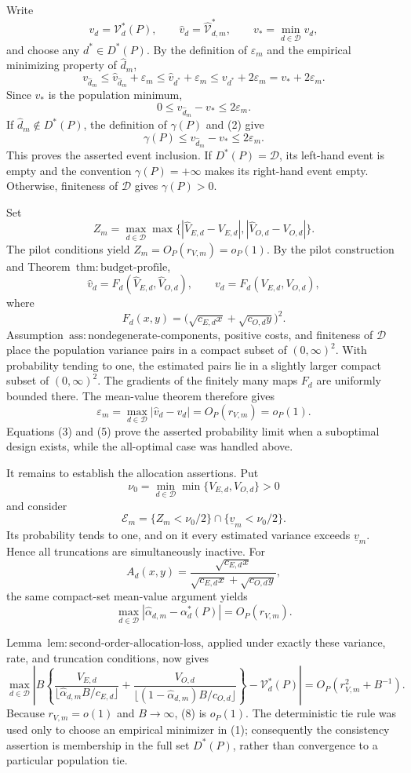 Write
\[
 v_d=\mathcal V_d^*(P),\qquad
 \widehat v_d=\widehat{\mathcal V}_{d,m}^*,\qquad
 v_* =\min_{d\in\mathcal D}v_d,
\]
and choose any \(d^*\in D^*(P)\).  By the definition of \(\varepsilon_m\) and the empirical minimizing property of \(\widehat d_m\),
\[
 v_{\widehat d_m}
 \le \widehat v_{\widehat d_m}+\varepsilon_m
 \le \widehat v_{d^*}+\varepsilon_m
 \le v_{d^*}+2\varepsilon_m
 =v_*+2\varepsilon_m. \tag{1}
\]
Since \(v_*\) is the population minimum,
\[
 0\le v_{\widehat d_m}-v_*\le2\varepsilon_m. \tag{2}
\]
If \(\widehat d_m\notin D^*(P)\), the definition of \(\gamma(P)\) and (2) give
\[
 \gamma(P)\le v_{\widehat d_m}-v_*\le2\varepsilon_m. \tag{3}
\]
This proves the asserted event inclusion.  If \(D^*(P)=\mathcal D\), its left-hand event is empty and the convention \(\gamma(P)=+\infty\) makes its right-hand event empty.  Otherwise, finiteness of \(\mathcal D\) gives \(\gamma(P)>0\).

Set
\[
 Z_m=\max_{d\in\mathcal D}\max\bigl\{
 |\widehat V_{E,d}-V_{E,d}|,
 |\widehat V_{O,d}-V_{O,d}|\bigr\}.
\]
The pilot conditions yield \(Z_m=O_P(r_{V,m})=o_P(1)\).  By the pilot construction and Theorem~\(\mathrm{thm{:}budget\text{-}profile}\),
\[
 \widehat v_d=F_d(\widehat V_{E,d},\widehat V_{O,d}),
 \qquad
 v_d=F_d(V_{E,d},V_{O,d}), \tag{4}
\]
where
\[
 F_d(x,y)=\bigl(\sqrt{c_{E,d}x}+\sqrt{c_{O,d}y}\bigr)^2.
\]
Assumption~\(\mathrm{ass{:}nondegenerate\text{-}components}\), positive costs, and finiteness of \(\mathcal D\) place the population variance pairs in a compact subset of \((0,\infty)^2\).  With probability tending to one, the estimated pairs lie in a slightly larger compact subset of \((0,\infty)^2\).  The gradients of the finitely many maps \(F_d\) are uniformly bounded there.  The mean-value theorem therefore gives
\[
 \varepsilon_m
 =\max_{d\in\mathcal D}|\widehat v_d-v_d|
 =O_P(r_{V,m})=o_P(1). \tag{5}
\]
Equations (3) and (5) prove the asserted probability limit when a suboptimal design exists, while the all-optimal case was handled above.

It remains to establish the allocation assertions.  Put
\[
 \nu_0=\min_{d\in\mathcal D}\min\{V_{E,d},V_{O,d}\}>0
\]
and consider
\[
 \mathcal E_m=\{Z_m<\nu_0/2\}\cap\{\underline v_m<\nu_0/2\}. \tag{6}
\]
Its probability tends to one, and on it every estimated variance exceeds \(\underline v_m\).  Hence all truncations are simultaneously inactive.  For
\[
 A_d(x,y)=
 \frac{\sqrt{c_{E,d}x}}
 {\sqrt{c_{E,d}x}+\sqrt{c_{O,d}y}},
\]
the same compact-set mean-value argument yields
\[
 \max_{d\in\mathcal D}
 |\widehat\alpha_{d,m}-\alpha_d^*(P)|=O_P(r_{V,m}). \tag{7}
\]

Lemma~\(\mathrm{lem{:}second\text{-}order\text{-}allocation\text{-}loss}\), applied under exactly these variance, rate, and truncation conditions, now gives
\[
\max_{d\in\mathcal D}\left|B\left\{
\frac{V_{E,d}}{\lfloor\widehat\alpha_{d,m}B/c_{E,d}\rfloor}
+\frac{V_{O,d}}{\lfloor(1-\widehat\alpha_{d,m})B/c_{O,d}\rfloor}
\right\}-\mathcal V_d^*(P)\right|
=O_P(r_{V,m}^2+B^{-1}). \tag{8}
\]
Because \(r_{V,m}=o(1)\) and \(B\to\infty\), (8) is \(o_P(1)\).  The deterministic tie rule was used only to choose an empirical minimizer in (1); consequently the consistency assertion is membership in the full set \(D^*(P)\), rather than convergence to a particular population tie.